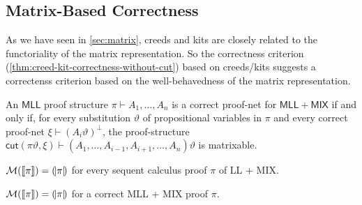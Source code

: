 \subsection{Matrix-Based Correctness}
As we have seen in \cref{sec:matrix}, creeds and kits are closely related to the functoriality of the matrix representation.
So the correctness criterion (\cref{thm:creed-kit-correctness-without-cut}) based on creeds/kits suggests a correctenss criterion based on the well-behavedness of the matrix representation.

\begin{theorem}
    An \(\mathsf{MLL}\) proof structure \( \pi \vdash A_1, \dots, A_n \) is a correct proof-net for \( \mathsf{MLL+MIX} \) if and only if, for every substitution \( \vartheta \) of propositional variables in \( \pi \) and every correct proof-net \( \xi \vdash (A_i\vartheta)^{\bot} \), the proof-structure \( \mathsf{cut}(\pi\vartheta, \xi) \vdash (A_1, \dots, A_{i-1}, A_{i+1}, \dots, A_n)\vartheta \) is matrixable. 
\end{theorem}

\begin{corollary}
    \( \mathcal{M}({\llbracket{\pi}\rrbracket}) = (\!|{\pi}|\!) \) for every sequent calculus proof \( \pi \) of LL + MIX.
\end{corollary}
\begin{corollary}
    \( \mathcal{M}({\llbracket{\pi}\rrbracket}) = (\!|{\pi}|\!) \) for a correct MLL + MIX proof \( \pi \). 
\end{corollary}

